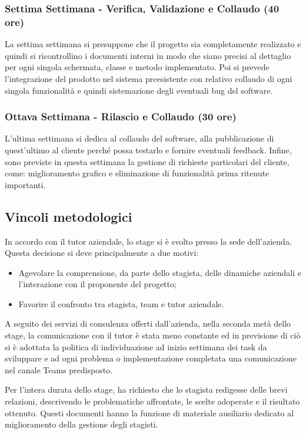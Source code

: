\subsubsection*{Settima Settimana - Verifica, Validazione e Collaudo (40 ore)}
La settima settimana si presuppone che il progetto sia completamente realizzato e quindi si ricontrollino i documenti interni in modo che siano precisi al dettaglio per ogni singola schermata, classe e metodo implementato.
Poi si prevede l'integrazione del prodotto nel sistema preesistente con relativo collaudo di ogni singola funzionalità e quindi sistemazione degli eventuali bug del software.


\subsubsection*{Ottava Settimana - Rilascio e Collaudo (30 ore)}
L'ultima settimana si dedica al collaudo del software, alla pubblicazione di quest'ultimo al cliente perché possa testarlo e fornire eventuali feedback. Infine, sono previste in questa settimana la gestione di richieste particolari del cliente, come: miglioramento grafico e  eliminazione di funzionalità prima ritenute importanti.


\subsection{Vincoli metodologici}
In accordo con il tutor aziendale, lo stage si è svolto presso la sede dell'azienda. Questa decisione si deve principalmente a due motivi: 
\begin{itemize}
	\item Agevolare la comprensione, da parte dello stagista, delle dinamiche aziendali e l’interazione con il proponente del progetto; 
	\item Favorire il confronto tra stagista, team e tutor aziendale.
\end{itemize}
A seguito dei servizi di consulenza offerti dall'azienda, nella seconda metà dello stage, la comunicazione con il tutor è stata meno constante ed in previsione di ciò si è adottata la politica di individuazione ad inizio settimana dei task da sviluppare e ad ogni problema o implementazione completata una comunicazione nel canale Teams predisposto.

Per l'intera durata dello stage, \azienda ha richiesto che lo stagista redigesse delle brevi relazioni, descrivendo le problematiche affrontate, le scelte adoperate e il risultato ottenuto. Questi documenti hanno la funzione di materiale ausiliario dedicato al miglioramento della gestione degli stagisti.

